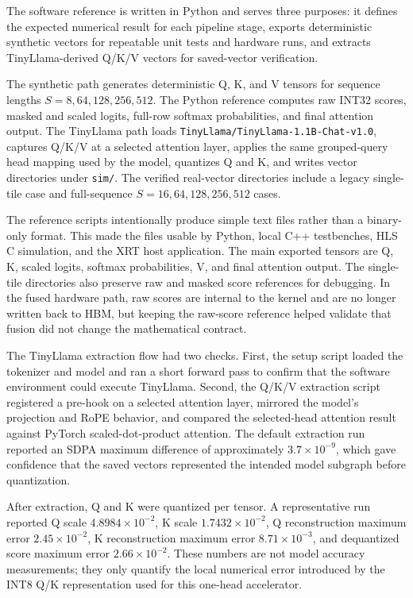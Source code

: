 \documentclass[conference]{IMSTemplate}
\begin{document}
The software reference is written in Python and serves three purposes: it
defines the expected numerical result for each pipeline stage, exports
deterministic synthetic vectors for repeatable unit tests and hardware runs,
and extracts TinyLlama-derived Q/K/V vectors for saved-vector verification.

The synthetic path generates deterministic Q, K, and V tensors for sequence
lengths \(S=8,64,128,256,512\). The Python reference computes raw INT32 scores,
masked and scaled logits, full-row softmax probabilities, and final attention
output. The TinyLlama path loads
\texttt{TinyLlama/TinyLlama-1.1B-Chat-v1.0}, captures Q/K/V at a selected
attention layer, applies the same grouped-query head mapping used by the model,
quantizes Q and K, and writes vector directories under \texttt{sim/}. The
verified real-vector directories include a legacy single-tile case and
full-sequence \(S=16,64,128,256,512\) cases.

The reference scripts intentionally produce simple text files rather than a
binary-only format. This made the files usable by Python, local C++ testbenches,
HLS C simulation, and the XRT host application. The main exported tensors are
Q, K, scaled logits, softmax probabilities, V, and final attention output. The
single-tile directories also preserve raw and masked score references for
debugging. In the fused hardware path, raw scores are internal to the kernel
and are no longer written back to HBM, but keeping the raw-score reference
helped validate that fusion did not change the mathematical contract.

The TinyLlama extraction flow had two checks. First, the setup script loaded the
tokenizer and model and ran a short forward pass to confirm that the software
environment could execute TinyLlama. Second, the Q/K/V extraction script
registered a pre-hook on a selected attention layer, mirrored the model's
projection and RoPE behavior, and compared the selected-head attention result
against PyTorch scaled-dot-product attention. The default extraction run
reported an SDPA maximum difference of approximately \(3.7\times10^{-9}\),
which gave confidence that the saved vectors represented the intended model
subgraph before quantization.

After extraction, Q and K were quantized per tensor. A representative run
reported Q scale \(4.8984\times10^{-2}\), K scale
\(1.7432\times10^{-2}\), Q reconstruction maximum error \(2.45\times10^{-2}\),
K reconstruction maximum error \(8.71\times10^{-3}\), and dequantized score
maximum error \(2.66\times10^{-2}\). These numbers are not model accuracy
measurements; they only quantify the local numerical error introduced by the
INT8 Q/K representation used for this one-head accelerator.
\end{document}
